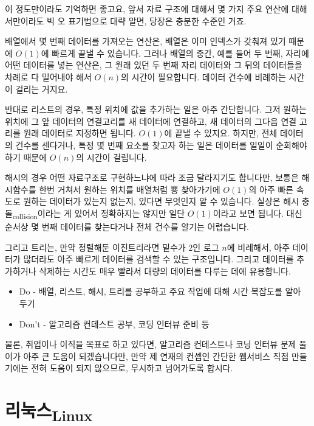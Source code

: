 \documentclass[11pt,a4paper]{article}
\newcommand{\sub}[1]{\textsubscript{#1}}
\begin{document}
이 정도만이라도 기억하면 좋고요, 앞서 자료 구조에 대해서 몇 가지 주요 연산에 대해서만이라도 빅 오 표기법으로 대략 알면, 당장은 충분한 수준인 거죠.

배열에서 몇 번째 데이터를 가져오는 연산은, 배열은 이미 인덱스가 갖춰져 있기 때문에 $O(1)$에 빠르게 끝낼 수 있습니다.  그러나 배열의 중간, 예를 들어 두 번째, 자리에 어떤 데이터를 넣는 연산은, 그 원래 있던 두 번째 자리 데이터와 그 뒤의 데이터들을 차례로 다 밀어내야 해서 $O(n)$의 시간이 필요합니다. 데이터 건수에 비례하는 시간이 걸리는 거지요.

반대로 리스트의 경우, 특정 위치에 값을 추가하는 일은 아주 간단합니다. 그저 원하는 위치에 그 앞 데이터의 연결고리를 새 데이터에 연결하고, 새 데이터의 그다음 연결 고리를 원래 데이터로 지정하면 됩니다. $O(1)$에 끝낼 수 있지요. 하지만, 전체 데이터의 건수를 센다거나, 특정 몇 번째 요소를 찾고자 하는 일은 데이터를 일일이 순회해야 하기 때문에 $O(n)$의 시간이 걸립니다.

해시의 경우 어떤 자료구조로 구현하느냐에 따라 조금 달라지기도 합니다만, 보통은 해시함수를 한번 거쳐서 원하는 위치를 배열처럼 뿅 찾아가기에 $O(1)$의 아주 빠른 속도로 원하는 데이터가 있는지 없는지, 있다면 무엇인지 알 수 있습니다. 실상은 해시 충돌\sub{collision}이라는 게 있어서 정확하지는 않지만 일단 $O(1)$이라고 보면 됩니다. 대신 순서상 몇 번째 데이터를 찾는다거나 전체 건수를 알기는 어렵습니다.

그리고 트리는, 만약 정렬해둔 이진트리라면 밑수가 $2$인 로그 $n$에 비례해서, 아주 데이터가 많더라도 아주 빠르게 데이터를 검색할 수 있는 구조입니다. 그리고 데이터를 추가하거나 삭제하는 시간도 매우 빨라서 대량의 데이터를 다루는 데에 유용합니다.

\begin{itemize}
\item{Do} - 배열, 리스트, 해시, 트리를 공부하고 주요 작업에 대해 시간 복잡도를 알아 두기
\item{Don't} - 알고리즘 컨테스트 공부, 코딩 인터뷰 준비 등
\end{itemize}

물론, 취업이나 이직을 목표로 하고 있다면, 알고리즘 컨테스트나 코닝 인터뷰 문제 풀이가 아주 큰 도움이 되겠습니다만, 만약 제 연재의 컨셉인 간단한 웹서비스 직접 만들기에는 전혀 도움이 되지 않으므로, 무시하고 넘어가도록 합시다.


\section[리눅스]{리눅스\sub{Linux}}
\end{document}
